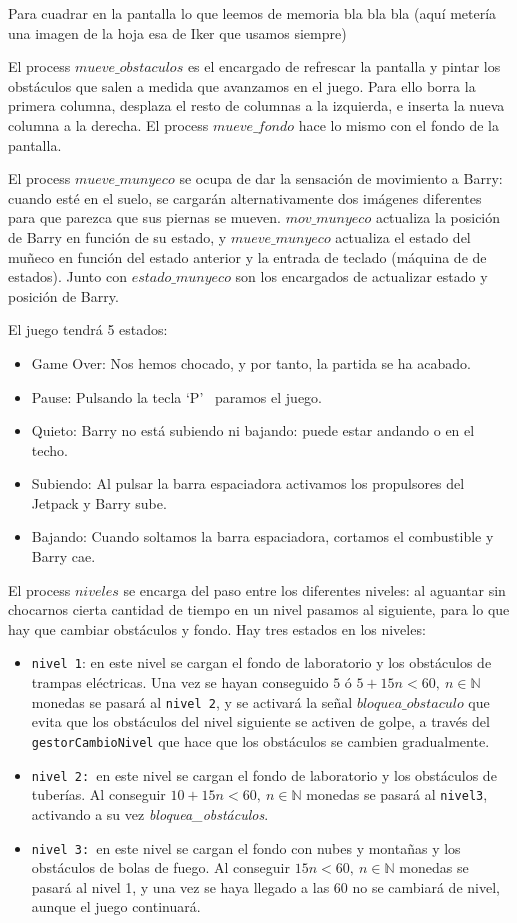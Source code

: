 \documentclass[11pt, a4paper, spanish, openright, twoside]{book}
\begin{document}
Para cuadrar en la pantalla lo que leemos de memoria bla bla bla (aquí metería una imagen de la hoja esa de Iker que usamos siempre)

El process $mueve\_obstaculos$ es el encargado de refrescar la pantalla y pintar los obstáculos que salen a medida que avanzamos en el juego. Para ello borra la primera columna, desplaza el resto de columnas a la izquierda, e inserta la nueva columna a la derecha. El process $mueve\_fondo$ hace lo mismo con el fondo de la pantalla.

El process $mueve\_munyeco$ se ocupa de dar la sensación de movimiento a Barry: cuando esté en el suelo, se cargarán alternativamente dos imágenes diferentes para que parezca que sus piernas se mueven.
$mov\_munyeco$ actualiza la posición de Barry en función de su estado, y $mueve\_munyeco$ actualiza el estado del muñeco en función del estado anterior y la entrada de teclado (máquina de de estados). Junto con $estado\_munyeco$ son los encargados de actualizar estado y posición de Barry.

El juego tendrá 5 estados:
\begin{itemize}
\item Game Over: Nos hemos chocado, y por tanto, la partida se ha acabado.
\item Pause: Pulsando la tecla `P'  \ paramos el juego.
\item Quieto: Barry no está subiendo ni bajando: puede estar andando o en el techo.
\item Subiendo: Al pulsar la barra espaciadora activamos los propulsores del Jetpack y Barry sube.
\item Bajando: Cuando soltamos la barra espaciadora, cortamos el combustible y Barry cae.
\end{itemize}


El process $niveles$ se encarga del paso entre los diferentes niveles: al aguantar sin chocarnos cierta cantidad de tiempo en un nivel pasamos al siguiente, para lo que hay que cambiar obstáculos y fondo.
Hay tres estados en los niveles:
\begin{itemize}
\item \texttt{nivel 1}: en este nivel se cargan el fondo de laboratorio y los obstáculos de trampas eléctricas. Una vez se hayan conseguido $5$ ó  $5+15n<60,\ n\in\mathbb{N}$  monedas se pasará al \texttt{nivel 2}, y se activará la señal $bloquea\_obstaculo$ que evita que los obstáculos del nivel siguiente se activen de golpe, a través del \texttt{gestorCambioNivel} que hace que los obstáculos se cambien gradualmente. 
\item \texttt{nivel 2: }en este nivel se cargan el fondo de laboratorio y los obstáculos de tuberías. Al conseguir  $10+15n<60,\ n\in\mathbb{N}$ monedas se pasará al \texttt{nivel3}, activando a su vez \textit{bloquea\_obstáculos}.
\item \texttt{nivel 3: }en este nivel se cargan el fondo con nubes y montañas y los obstáculos de bolas de fuego. Al conseguir $15n<60,\ n\in\mathbb{N}$ monedas se pasará al nivel 1, y una vez se haya llegado a las 60 no se cambiará de nivel, aunque el juego continuará. 
\end{itemize}
\end{document}
